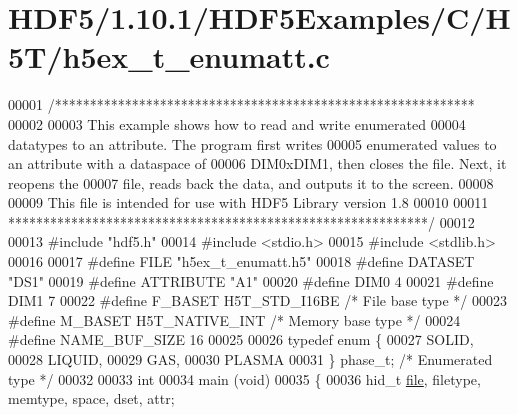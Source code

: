 \hypertarget{_h_d_f5_21_810_81_2_h_d_f5_examples_2_c_2_h5_t_2h5ex__t__enumatt_8c_source}{}\section{H\+D\+F5/1.10.1/\+H\+D\+F5\+Examples/\+C/\+H5\+T/h5ex\+\_\+t\+\_\+enumatt.c}
\label{_h_d_f5_21_810_81_2_h_d_f5_examples_2_c_2_h5_t_2h5ex__t__enumatt_8c_source}

\begin{DoxyCode}
00001 \textcolor{comment}{/************************************************************}
00002 \textcolor{comment}{}
00003 \textcolor{comment}{  This example shows how to read and write enumerated}
00004 \textcolor{comment}{  datatypes to an attribute.  The program first writes}
00005 \textcolor{comment}{  enumerated values to an attribute with a dataspace of}
00006 \textcolor{comment}{  DIM0xDIM1, then closes the file.  Next, it reopens the}
00007 \textcolor{comment}{  file, reads back the data, and outputs it to the screen.}
00008 \textcolor{comment}{}
00009 \textcolor{comment}{  This file is intended for use with HDF5 Library version 1.8}
00010 \textcolor{comment}{}
00011 \textcolor{comment}{ ************************************************************/}
00012 
00013 \textcolor{preprocessor}{#include "hdf5.h"}
00014 \textcolor{preprocessor}{#include <stdio.h>}
00015 \textcolor{preprocessor}{#include <stdlib.h>}
00016 
00017 \textcolor{preprocessor}{#define FILE            "h5ex\_t\_enumatt.h5"}
00018 \textcolor{preprocessor}{#define DATASET         "DS1"}
00019 \textcolor{preprocessor}{#define ATTRIBUTE       "A1"}
00020 \textcolor{preprocessor}{#define DIM0            4}
00021 \textcolor{preprocessor}{#define DIM1            7}
00022 \textcolor{preprocessor}{#define F\_BASET         H5T\_STD\_I16BE       }\textcolor{comment}{/* File base type */}\textcolor{preprocessor}{}
00023 \textcolor{preprocessor}{#define M\_BASET         H5T\_NATIVE\_INT      }\textcolor{comment}{/* Memory base type */}\textcolor{preprocessor}{}
00024 \textcolor{preprocessor}{#define NAME\_BUF\_SIZE   16}
00025 
00026 \textcolor{keyword}{typedef} \textcolor{keyword}{enum} \{
00027     SOLID,
00028     LIQUID,
00029     GAS,
00030     PLASMA
00031 \} phase\_t;                                  \textcolor{comment}{/* Enumerated type */}
00032 
00033 \textcolor{keywordtype}{int}
00034 main (\textcolor{keywordtype}{void})
00035 \{
00036     hid\_t       \hyperlink{structfile}{file}, filetype, memtype, space, dset, attr;

\end{DoxyCode}
